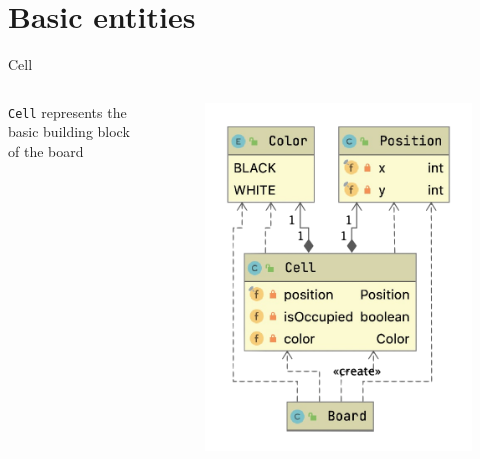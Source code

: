 \documentclass{beamer}
\begin{document}
\section{Basic entities}
\begin{frame}{Cell}

\begin{columns}
\texttt{Cell} represents the basic building block of the board 

\begin{figure}
	\includegraphics[scale=0.4]{images/cell-class.png}
\end{figure}

\end{columns}


\end{frame}
\end{document}
